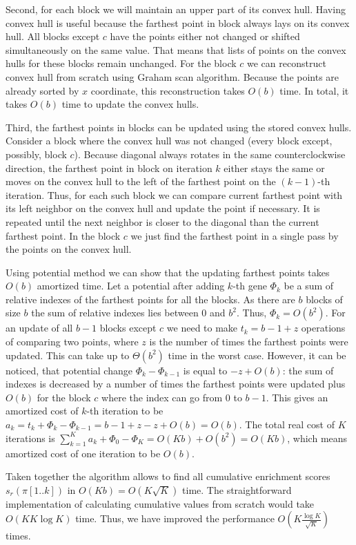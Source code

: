 \documentclass[runningheads,a4paper]{llncs}
\begin{document}
Second, for each block we will maintain an upper part of its convex hull.
Having convex hull is useful because the farthest point in block always
lays on its convex hull.
All blocks except $c$ have the points either not changed or
shifted simultaneously on the same value. That means that lists of points
on the convex hulls for these blocks remain unchanged. For the block $c$
we can reconstruct convex hull from scratch using Graham scan algorithm.
Because the points are already sorted by $x$ coordinate, this
reconstruction takes $O(b)$ time. In total, it takes $O(b)$ time
to update the convex hulls.

Third, the farthest points in blocks can be updated using the stored convex
hulls. Consider a block where the convex hull was not changed (every block
except, possibly, block $c$). Because diagonal always rotates in the same
counterclockwise direction, the farthest point in block on iteration $k$
either stays the same or moves on the convex hull to the left of 
the farthest point on the $(k-1)$-th iteration.
Thus, for each such block we can compare current farthest
point with its left neighbor on the convex hull and update the point if
necessary. It is repeated until the next neighbor is closer to the 
diagonal than the current farthest point. In the block $c$ we just 
find the farthest point in a single pass by the points on the convex hull.

Using potential method we can show that the updating farthest points
takes $O(b)$ amortized time. Let a potential after adding $k$-th
gene $\Phi_k$ be a sum of relative indexes of the farthest points
for all the blocks. As there are $b$ blocks of size $b$ the sum of relative
indexes lies between 0 and $b^2$. Thus, $\Phi_k = O(b^2)$. For an 
update of all $b-1$ blocks except $c$ we need to make $t_k=b-1+z$ 
operations of comparing two points,
where $z$ is the number of times the farthest points were updated. 
This can take up to $\Theta(b^2)$ time in the worst case.
However, it can be noticed, that 
potential change $\Phi_k-\Phi_{k-1}$ is
equal to $-z + O(b)$: the sum of indexes is decreased by a number of 
times the farthest points were updated plus $O(b)$ for the block
$c$ where the index can go from 0 to $b-1$.
This gives an amortized cost of $k$-th iteration to be $a_k = t_k + \Phi_k - \Phi_{k-1} = 
b - 1 + z -z + O(b) = O(b)$. The total real cost of $K$ iterations 
is $\sum_{k=1}^K a_k + \Phi_0 - \Phi_K = O(Kb) + O(b^2) = O(Kb)$,
which means amortized cost of one iteration to be $O(b)$.

Taken together the algorithm allows to find all cumulative
enrichment scores $s_r(\pi[1..k])$ in $O(Kb) = O(K\sqrt{K})$ time.
The straightforward implementation of calculating cumulative
values from scratch would take $O(KK\log K)$ time. Thus,
we have improved the performance $O(K \frac{\log K}{\sqrt{K}})$ times.
\end{document}
